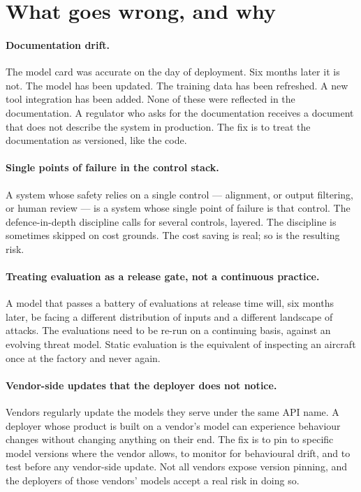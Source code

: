 \section{What goes wrong, and why}

\paragraph{Documentation drift.} The model card was accurate
on the day of deployment. Six months later it is not. The
model has been updated. The training data has been refreshed.
A new tool integration has been added. None of these were
reflected in the documentation. A regulator who asks for the
documentation receives a document that does not describe the
system in production. The fix is to treat the documentation as
versioned, like the code.

\paragraph{Single points of failure in the control stack.} A
system whose safety relies on a single control --- alignment,
or output filtering, or human review --- is a system whose
single point of failure is that control. The defence-in-depth
discipline calls for several controls, layered. The discipline
is sometimes skipped on cost grounds. The cost saving is
real; so is the resulting risk.

\paragraph{Treating evaluation as a release gate, not a
continuous practice.} A model that passes a battery of
evaluations at release time will, six months later, be facing
a different distribution of inputs and a different landscape
of attacks. The evaluations need to be re-run on a continuing
basis, against an evolving threat model. Static evaluation is
the equivalent of inspecting an aircraft once at the factory
and never again.

\paragraph{Vendor-side updates that the deployer does not
notice.} Vendors regularly update the models they serve under
the same API name. A deployer whose product is built on a
vendor's model can experience behaviour changes without
changing anything on their end. The fix is to pin to specific
model versions where the vendor allows, to monitor for
behavioural drift, and to test before any vendor-side update.
Not all vendors expose version pinning, and the deployers of
those vendors' models accept a real risk in doing so.

